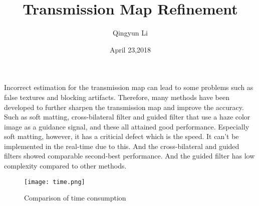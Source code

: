 \documentclass{article}
\author{Qingyun Li}
\date{April 23,2018}
\title{Transmission Map Refinement}
\begin{document}
\maketitle
\par Incorrect estimation for the transmission map can lead to some problems such as false textures and blocking artifacts. Therefore, many methods have been developed to further sharpen the transmission map and improve the accuracy. Such as soft matting, cross-bilateral filter and guided filter that use a haze color image as a guidance signal, and these all attained good performance. Especially soft matting, however, it has a criticial defect which is the speed. It can't be implemented in the real-time due to this. And the cross-bilateral and guided filters showed comparable second-best performance. And the guided filter has low complexity compared to other methods. 
\begin{figure}[htbp]
\begin{minipage}{1\linewidth}
\centering{}
\texttt{[image: time.png]}\\
\caption{Comparison of time consumption}\label{time} 
\end{minipage} 
\end{figure}
\end{document}

